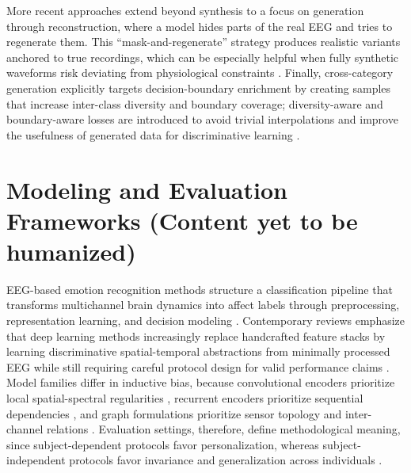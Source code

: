 \documentclass{WileyMSP-template}
\begin{document}
More recent approaches extend beyond synthesis to a focus on generation through reconstruction, where a model hides parts of the real EEG and tries to regenerate them. This “mask-and-regenerate” strategy produces realistic variants anchored to true recordings, which can be especially helpful when fully synthetic waveforms risk deviating from physiological constraints \cite{zhang2022_ganser}. Finally, cross-category generation explicitly targets decision-boundary enrichment by creating samples that increase inter-class diversity and boundary coverage; diversity-aware and boundary-aware losses are introduced to avoid trivial interpolations and improve the usefulness of generated data for discriminative learning \cite{zhang2024_cccl}.

\section{Modeling and Evaluation Frameworks (Content yet to be humanized)}

EEG-based emotion recognition methods structure a classification pipeline that transforms multichannel brain dynamics into affect labels through preprocessing, representation learning, and decision modeling \cite{rahman2021eegreview}. Contemporary reviews emphasize that deep learning methods increasingly replace handcrafted feature stacks by learning discriminative spatial-temporal abstractions from minimally processed EEG while still requiring careful protocol design for valid performance claims \cite{li2018cnn,rahman2021eegreview}. Model families differ in inductive bias, because convolutional encoders prioritize local spatial-spectral regularities \cite{li2018cnn}, recurrent encoders prioritize sequential dependencies \cite{yang2018rnn}, and graph formulations prioritize sensor topology and inter-channel relations \cite{wang2022gcn}. Evaluation settings, therefore, define methodological meaning, since subject-dependent protocols favor personalization, whereas subject-independent protocols favor invariance and generalization across individuals \cite{craik2019deep}.

\end{document}
